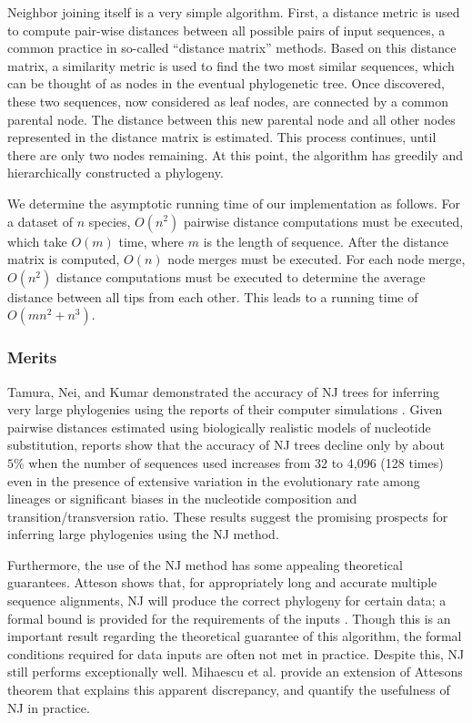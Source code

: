 \documentclass[10pt,twocolumn]{article}
\begin{document}
Neighbor joining itself is a very simple algorithm. First, a distance metric is used to compute pair-wise distances between all possible pairs of input sequences, a common practice in so-called ``distance matrix'' methods. Based on this distance matrix, a similarity metric is used to find the two most similar sequences, which can be thought of as nodes in the eventual phylogenetic tree. Once discovered, these two sequences, now considered as leaf nodes, are connected by a common parental node. The distance between this new parental node and all other nodes represented in the distance matrix is estimated. This process continues, until there are only two nodes remaining. At this point, the algorithm has greedily and hierarchically constructed a phylogeny.

We determine the asymptotic running time of our implementation as follows. For a dataset of $n$ species, $O(n^2)$ pairwise distance computations must be executed, which take $O(m)$ time, where $m$ is the length of sequence. After the distance matrix is computed, $O(n)$ node merges must be executed. For each node merge, $O(n^2)$ distance computations must be executed to determine the average distance between all tips from each other. This leads to a running time of $O(mn^2 + n^3)$.

\subsubsection*{Merits}
Tamura, Nei, and Kumar demonstrated the accuracy of NJ trees for inferring very large phylogenies using the reports of their computer simulations \cite{tamura2004prospects}. Given pairwise distances estimated using biologically realistic models of nucleotide substitution, reports show that the accuracy of NJ trees decline only by about $5\%$ when the number of sequences used increases from 32 to 4,096 (128 times) even in the presence of extensive variation in the evolutionary rate among lineages or significant biases in the nucleotide composition and transition/transversion ratio. These results suggest the promising prospects for inferring large phylogenies using the NJ method.

Furthermore, the use of the NJ method has some appealing theoretical guarantees. Atteson shows that, for appropriately long and accurate multiple sequence alignments, NJ will produce the correct phylogeny for certain data; a formal bound is provided for the requirements of the inputs \cite{atteson1999performance}. Though this is an important result regarding the theoretical guarantee of this algorithm, the formal conditions required for data inputs are often not met in practice. Despite this, NJ still performs exceptionally well. Mihaescu et al. \cite{mihaescu2009neighbor} provide an extension of Attesons theorem that explains this apparent discrepancy, and quantify the usefulness of NJ in practice.
\end{document}
